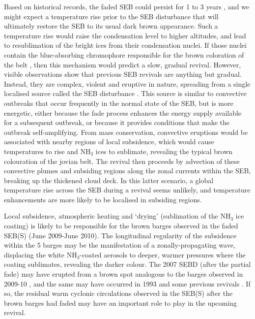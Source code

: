 \documentclass[final,5p,times,twocolumn,authoryear]{elsarticle}
\begin{document}
Based on historical records, the faded SEB could persist for 1 to 3 years \citep{95rogers, 96sanchez_jup}, and we might expect a temperature rise \citep{81orton, 92yanamandra} prior to the SEB disturbance that will ultimately restore the SEB to its usual dark brown appearance.  Such a temperature rise would raise the condensation level to higher altitudes, and lead to resublimation of the bright ices from their condensation nuclei.  If those nuclei contain the blue-absorbing chromophore responsible for the brown coloration of the belt \citep{86west}, then this mechanism would predict a slow, gradual revival.  However, visible observations show that previous SEB revivals are anything but gradual.  Instead, they are complex, violent and eruptive in nature, spreading from a single localised source called the SEB disturbance \citep[SEBD,][]{95rogers, 96sanchez_jup}.  This source is similar to convective outbreaks that occur frequently in the normal state of the SEB, but is more energetic, either because the fade process enhances the energy supply available for a subsequent outbreak, or because it provides conditions that make the outbreak self-amplifying.  From mass conservation, convective eruptions would be associated with nearby regions of local subsidence, which would cause temperatures to rise and NH$_3$ ices to sublimate, revealing the typical brown colouration of the jovian belt.  The revival then proceeds by advection of these convective plumes and subsiding regions \citep[the dark `columns' observed during previous SEB revivals,][]{95rogers} along the zonal currents within the SEB, breaking up the thickened cloud deck.  In this latter scenario, a global temperature rise across the SEB during a revival seems unlikely, and temperature enhancements are more likely to be localised in subsiding regions.

Local subsidence, atmospheric heating and `drying' (sublimation of the NH$_3$ ice coating) is likely to be responsible for the brown barges observed in the faded SEB(S) (June 2009-June 2010).  The longitudinal regularity of the subsidence within the 5 barges may be the manifestation of a zonally-propagating wave, displacing the white NH$_3$-coated aerosols to deeper, warmer pressures where the coating sublimates, revealing the darker colour. The 2007 SEBD (after the partial fade) may have erupted from a brown spot analogous to the barges observed in 2009-10 \citep{07rogers}, and the same may have occurred in 1993 \citep{96sanchez_jup} and some previous revivals \citep{95rogers}.  If so, the residual warm cyclonic circulations observed in the SEB(S) after the brown barges had faded may have an important role to play in the upcoming revival.
\end{document}
